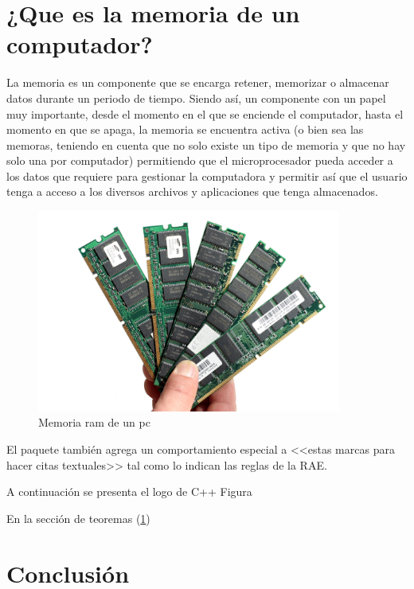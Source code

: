\documentclass{article}
\begin{document}
\section{¿Que es la memoria de un computador?} \label{contenido}
La memoria es un componente que se encarga retener, memorizar o almacenar datos durante un periodo de tiempo.\cite{definicion}
Siendo así, un componente con un papel muy importante, desde el momento en el que se enciende el computador, hasta el momento en que se apaga, la memoria se encuentra activa (o bien sea las memoras, teniendo en cuenta que no solo existe un tipo de memoria y que no hay solo una por computador) permitiendo que el microprocesador pueda acceder a los datos que requiere para gestionar la computadora y permitir así que el usuario tenga a acceso a los diversos archivos y aplicaciones que tenga almacenados. 
   
\begin{figure}[h]
\includegraphics[width=10cm]{Memoria.jpg}
\centering
\caption{Memoria ram de un pc}
\label{fig:memoriapc}
\end{figure}
    
El paquete también agrega un comportamiento especial 
a <<estas marcas para hacer citas textuales>> tal como 
lo indican las reglas de la RAE.


A continuación se presenta el logo de C++ Figura 



En la sección de teoremas (\ref{contenido})

\section{Conclusión} \label{conclulsion}



\end{document}

